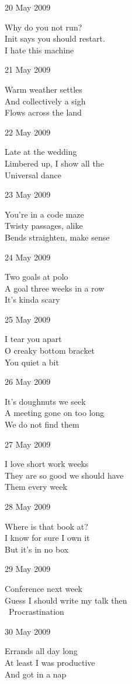 \documentclass[12pt]{article}
\begin{document}
20 May 2009

Why do you not run? \\
Init says you should restart. \\
I hate this machine

21 May 2009

Warm weather settles \\
And collectively a sigh \\
Flows across the land

22 May 2009

Late at the wedding \\
Limbered up, I show all the \\
Universal dance

23 May 2009

You're in a code maze \\
Twisty passages, alike \\
Bends straighten, make sense

24 May 2009

Two goals at polo \\
A goal three weeks in a row \\
It's kinda scary

\newpage

25 May 2009

I tear you apart \\
O creaky bottom bracket \\
You quiet a bit

26 May 2009

It's doughnuts we seek \\
A meeting gone on too long \\
We do not find them

27 May 2009

I love short work weeks \\
They are so good we should have \\
Them every week

28 May 2009

Where is that book at? \\
I know for sure I own it \\
But it's in no box

29 May 2009

Conference next week \\
Guess I should write my talk then \\\
Procrastination

30 May 2009

Errands all day long \\
At least I was productive \\
And got in a nap
\end{document}
